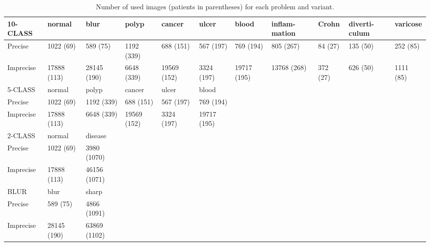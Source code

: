 \documentclass[preprint]{article}
\renewcommand{\twocolumn}{}
\begin{document}
\begin{longtable}{p{1.5cm}|p{0.9cm}|p{0.9cm}|p{0.7cm}p{0.7cm}p{0.7cm}p{0.7cm}p{1.2cm}p{0.7cm}p{0.75cm}p{0.7cm}}
\caption{Number of used images (patients in parentheses) for each problem and variant. }\\

10-CLASS& normal&blur&polyp&cancer&ulcer&blood&inflam-mation& Crohn &diverti-culum&varicose\\
\hline
Precise
&1022 (69)
&589 (75)
&1192 (339)
&688 (151)
&567 (197)
&769 (194)
&805 (267)
&84 (27)
&135 (50)
&252 (85)\\
\hline
Imprecise
&17888 (113)
&28145 (190)
&6648 (339)
&19569 (152)
&3324 (197)
&19717 (195)
&13768 (268)
&372 (27)
&626 (50)
&1111 (85)
\\
\hline
5-CLASS&
normal&
polyp&
cancer&
ulcer&
blood&&&&& \\
\cline{1-6}
Precise
&1022 (69)
&1192 (339)
&688 (151)
&567 (197)
&769 (194)\\
\cline{1-6}
Imprecise
&17888 (113)
&6648 (339)
&19569 (152)
&3324 (197)
&19717 (195)\\
\cline{1-6}

2-CLASS&normal
&disease& & & & & & & & \\
\cline{1-3}
Precise
&1022 (69)
&3980 (1070)\\
\cline{1-3}
Imprecise
&17888 (113)
&46156 (1071)\\
\cline{1-3}
BLUR&
blur&
sharp& & & & & & & & \\
\cline{1-3}
Precise
&589 (75)
&4866 (1091)\\
\cline{1-3}
Imprecise
&28145 (190)
&63869 (1102)\\
\cline{1-3}
\end{longtable}

\normalsize



\twocolumn

\fi %
\end{document}
